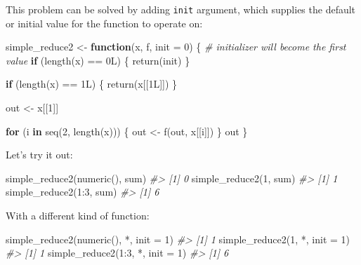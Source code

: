 \documentclass[
]{book}
\newenvironment{Shaded}{\begin{snugshade}}{\end{snugshade}}
\newcommand{\AttributeTok}[1]{\textcolor[rgb]{0.77,0.63,0.00}{#1}}
\newcommand{\CommentTok}[1]{\textcolor[rgb]{0.56,0.35,0.01}{\textit{#1}}}
\newcommand{\ControlFlowTok}[1]{\textcolor[rgb]{0.13,0.29,0.53}{\textbf{#1}}}
\newcommand{\DecValTok}[1]{\textcolor[rgb]{0.00,0.00,0.81}{#1}}
\newcommand{\FunctionTok}[1]{\textcolor[rgb]{0.00,0.00,0.00}{#1}}
\newcommand{\NormalTok}[1]{#1}
\newcommand{\OtherTok}[1]{\textcolor[rgb]{0.56,0.35,0.01}{#1}}
\newcommand{\SpecialCharTok}[1]{\textcolor[rgb]{0.00,0.00,0.00}{#1}}
\newcommand{\StringTok}[1]{\textcolor[rgb]{0.31,0.60,0.02}{#1}}
\begin{document}
This problem can be solved by adding \texttt{init} argument, which supplies the default or initial value for the function to operate on:

\begin{Shaded}
\begin{Highlighting}[]
\NormalTok{simple\_reduce2 }\OtherTok{\textless{}{-}} \ControlFlowTok{function}\NormalTok{(x, f, }\AttributeTok{init =} \DecValTok{0}\NormalTok{) \{}
  \CommentTok{\# initializer will become the first value}
  \ControlFlowTok{if}\NormalTok{ (}\FunctionTok{length}\NormalTok{(x) }\SpecialCharTok{==}\NormalTok{ 0L) \{}
    \FunctionTok{return}\NormalTok{(init)}
\NormalTok{  \}}

  \ControlFlowTok{if}\NormalTok{ (}\FunctionTok{length}\NormalTok{(x) }\SpecialCharTok{==}\NormalTok{ 1L) \{}
    \FunctionTok{return}\NormalTok{(x[[1L]])}
\NormalTok{  \}}

\NormalTok{  out }\OtherTok{\textless{}{-}}\NormalTok{ x[[}\DecValTok{1}\NormalTok{]]}

  \ControlFlowTok{for}\NormalTok{ (i }\ControlFlowTok{in} \FunctionTok{seq}\NormalTok{(}\DecValTok{2}\NormalTok{, }\FunctionTok{length}\NormalTok{(x))) \{}
\NormalTok{    out }\OtherTok{\textless{}{-}} \FunctionTok{f}\NormalTok{(out, x[[i]])}
\NormalTok{  \}}
\NormalTok{  out}
\NormalTok{\}}
\end{Highlighting}
\end{Shaded}

Let's try it out:

\begin{Shaded}
\begin{Highlighting}[]
\FunctionTok{simple\_reduce2}\NormalTok{(}\FunctionTok{numeric}\NormalTok{(), sum)}
\CommentTok{\#\textgreater{} [1] 0}
\FunctionTok{simple\_reduce2}\NormalTok{(}\DecValTok{1}\NormalTok{, sum)}
\CommentTok{\#\textgreater{} [1] 1}
\FunctionTok{simple\_reduce2}\NormalTok{(}\DecValTok{1}\SpecialCharTok{:}\DecValTok{3}\NormalTok{, sum)}
\CommentTok{\#\textgreater{} [1] 6}
\end{Highlighting}
\end{Shaded}

With a different kind of function:

\begin{Shaded}
\begin{Highlighting}[]
\FunctionTok{simple\_reduce2}\NormalTok{(}\FunctionTok{numeric}\NormalTok{(), }\StringTok{\textasciigrave{}}\AttributeTok{*}\StringTok{\textasciigrave{}}\NormalTok{, }\AttributeTok{init =} \DecValTok{1}\NormalTok{)}
\CommentTok{\#\textgreater{} [1] 1}
\FunctionTok{simple\_reduce2}\NormalTok{(}\DecValTok{1}\NormalTok{, }\StringTok{\textasciigrave{}}\AttributeTok{*}\StringTok{\textasciigrave{}}\NormalTok{, }\AttributeTok{init =} \DecValTok{1}\NormalTok{)}
\CommentTok{\#\textgreater{} [1] 1}
\FunctionTok{simple\_reduce2}\NormalTok{(}\DecValTok{1}\SpecialCharTok{:}\DecValTok{3}\NormalTok{, }\StringTok{\textasciigrave{}}\AttributeTok{*}\StringTok{\textasciigrave{}}\NormalTok{, }\AttributeTok{init =} \DecValTok{1}\NormalTok{)}
\CommentTok{\#\textgreater{} [1] 6}
\end{Highlighting}
\end{Shaded}
\end{document}
